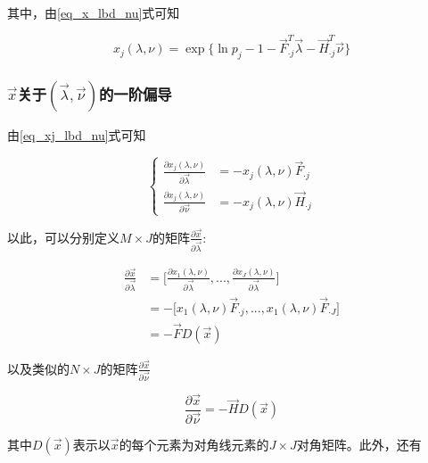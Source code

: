 其中，由\ref{eq_x_lbd_nu}式可知

\begin{equation}\label{eq_xj_lbd_nu}
    x_j(\lambda, \nu) = \exp\Big\{\ln p_j - 1 - \vec{F}_{\cdot j}^T\vec{\lambda} - \vec{H}_{\cdot j}^T\vec{\nu}\Big\}
\end{equation}

\subsubsection{$\vec{x}$关于$(\vec{\lambda}, \vec{\nu})$的一阶偏导}
由\ref{eq_xj_lbd_nu}式可知

\begin{equation}
    \left\{
    \begin{aligned}
        \frac{\partial x_j(\lambda, \nu)}{\partial \vec{\lambda}} & = - x_j(\lambda, \nu)\vec{F}_{\cdot j} \\
        \frac{\partial x_j(\lambda, \nu)}{\partial \vec{\nu}}     & = - x_j(\lambda, \nu)\vec{H}_{\cdot j}
    \end{aligned}
    \right.
\end{equation}

以此，可以分别定义$M\times J$的矩阵$\frac{\partial\vec{x}}{\partial \vec{\lambda} }$:

\begin{equation}
    \begin{aligned}
        \frac{\partial \vec{x}}{\partial \vec{\lambda}} & =\Big[\frac{\partial x_1(\lambda, \nu)}{\partial \vec{\lambda}},...,\frac{\partial x_J(\lambda, \nu)}{\partial \vec{\lambda}}\Big] \\
                                                        & = -\Big[x_1(\lambda, \nu)\vec{F}_{\cdot j},...,x_1(\lambda, \nu)\vec{F}_{\cdot J}\Big]                                             \\
                                                        & = -\vec{F}D(\vec{x})
    \end{aligned}
\end{equation}

以及类似的$N\times J$的矩阵$\frac{\partial\vec{x}}{\partial \vec{\nu} }$

\begin{equation}
    \frac{\partial \vec{x}}{\partial \vec{\nu}} =-\vec{H}D(\vec{x})
\end{equation}

其中$D(\vec{x})$表示以$\vec{x}$的每个元素为对角线元素的$J\times J$对角矩阵。此外，还有

